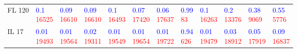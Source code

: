 \begin{tabular}{llllllllllll}
FL 120 &   \makecell{\textcolor{blue}{0.1} \\ \textcolor{red}{16525}} &  \makecell{\textcolor{blue}{0.09} \\ \textcolor{red}{16610}} &  \makecell{\textcolor{blue}{0.09} \\ \textcolor{red}{16610}} &   \makecell{\textcolor{blue}{0.1} \\ \textcolor{red}{16493}} &  \makecell{\textcolor{blue}{0.07} \\ \textcolor{red}{17420}} &  \makecell{\textcolor{blue}{0.06} \\ \textcolor{red}{17637}} &    \makecell{\textcolor{blue}{0.99} \\ \textcolor{red}{83}} &   \makecell{\textcolor{blue}{0.1} \\ \textcolor{red}{16263}} &   \makecell{\textcolor{blue}{0.2} \\ \textcolor{red}{13376}} &   \makecell{\textcolor{blue}{0.38} \\ \textcolor{red}{9069}} &   \makecell{\textcolor{blue}{0.55} \\ \textcolor{red}{5776}} \\
IL 17  &  \makecell{\textcolor{blue}{0.01} \\ \textcolor{red}{19493}} &  \makecell{\textcolor{blue}{0.01} \\ \textcolor{red}{19564}} &  \makecell{\textcolor{blue}{0.02} \\ \textcolor{red}{19311}} &  \makecell{\textcolor{blue}{0.01} \\ \textcolor{red}{19549}} &  \makecell{\textcolor{blue}{0.01} \\ \textcolor{red}{19654}} &  \makecell{\textcolor{blue}{0.01} \\ \textcolor{red}{19722}} &   \makecell{\textcolor{blue}{0.94} \\ \textcolor{red}{626}} &  \makecell{\textcolor{blue}{0.01} \\ \textcolor{red}{19479}} &  \makecell{\textcolor{blue}{0.03} \\ \textcolor{red}{18912}} &  \makecell{\textcolor{blue}{0.05} \\ \textcolor{red}{17919}} &  \makecell{\textcolor{blue}{0.09} \\ \textcolor{red}{16837}} \\

\end{tabular}
